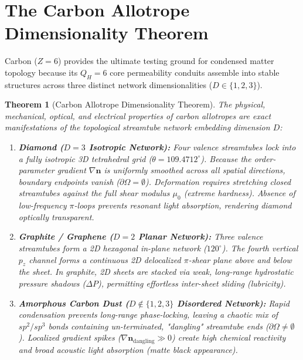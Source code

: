 \documentclass[11pt,a4paper]{article}
\newtheorem{thm}{Theorem}
\begin{document}
	\section{The Carbon Allotrope Dimensionality Theorem}
	\label{sec:allotrope_dimensionality}
	
	Carbon ($Z=6$) provides the ultimate testing ground for condensed matter topology because its $Q_H = 6$ core permeability conduits assemble into stable structures across three distinct network dimensionalities ($D \in \{1, 2, 3\}$).
	
	\begin{thm}[Carbon Allotrope Dimensionality Theorem]
		\label{thm:allotrope_dimensionality}
		The physical, mechanical, optical, and electrical properties of carbon allotropes are exact manifestations of the topological streamtube network embedding dimension $D$:
		\begin{enumerate}
			\item \textbf{Diamond ($D=3$ Isotropic Network):} Four valence streamtubes lock into a fully isotropic 3D tetrahedral grid ($\theta = 109.4712^\circ$). Because the order-parameter gradient $\nabla \mathbf{n}$ is uniformly smoothed across all spatial directions, boundary endpoints vanish ($\partial \Omega = \emptyset$). Deformation requires stretching closed streamtubes against the full shear modulus $\mu_0$ (extreme hardness). Absence of low-frequency $\pi$-loops prevents resonant light absorption, rendering diamond optically transparent.
			
			\item \textbf{Graphite / Graphene ($D=2$ Planar Network):} Three valence streamtubes form a 2D hexagonal in-plane network ($120^\circ$). The fourth vertical $p_z$ channel forms a continuous 2D delocalized $\pi$-shear plane above and below the sheet. In graphite, 2D sheets are stacked via weak, long-range hydrostatic pressure shadows ($\Delta P$), permitting effortless inter-sheet sliding (lubricity).
			
			\item \textbf{Amorphous Carbon Dust ($D \notin \{1,2,3\}$ Disordered Network):} Rapid condensation prevents long-range phase-locking, leaving a chaotic mix of $sp^2/sp^3$ bonds containing un-terminated, "dangling" streamtube ends ($\partial \Omega \neq \emptyset$). Localized gradient spikes ($\nabla \mathbf{n}_{\text{dangling}} \gg 0$) create high chemical reactivity and broad acoustic light absorption (matte black appearance).
		\end{enumerate}
	\end{thm}
	
\end{document}
